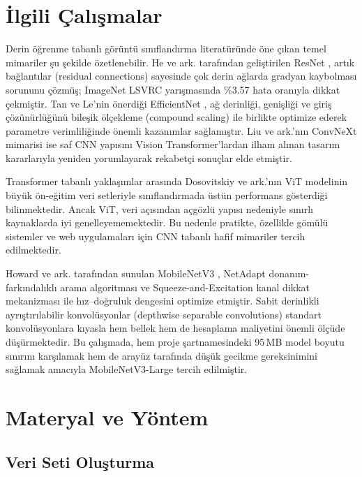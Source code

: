 \documentclass[conference]{IEEEtran}
\begin{document}
\section{İlgili Çalışmalar}

Derin öğrenme tabanlı görüntü sınıflandırma literatüründe öne çıkan
temel mimariler şu şekilde özetlenebilir. He ve ark. tarafından
geliştirilen ResNet \cite{resnet}, artık bağlantılar (residual connections)
sayesinde çok derin ağlarda gradyan kaybolması sorununu çözmüş; ImageNet
LSVRC yarışmasında \%3.57 hata oranıyla dikkat çekmiştir. Tan ve Le'nin
önerdiği EfficientNet \cite{efficientnet}, ağ derinliği, genişliği ve
giriş çözünürlüğünü bileşik ölçekleme (compound scaling) ile birlikte
optimize ederek parametre verimliliğinde önemli kazanımlar sağlamıştır.
Liu ve ark.'nın ConvNeXt \cite{convnext} mimarisi ise saf CNN yapısını
Vision Transformer'lardan ilham alınan tasarım kararlarıyla yeniden
yorumlayarak rekabetçi sonuçlar elde etmiştir.

Transformer tabanlı yaklaşımlar arasında Dosovitskiy ve ark.'nın ViT
modelinin \cite{vit} büyük ön-eğitim veri setleriyle sınıflandırmada
üstün performans gösterdiği bilinmektedir. Ancak ViT, veri açısından
açgözlü yapısı nedeniyle sınırlı kaynaklarda iyi genelleyememektedir.
Bu nedenle pratikte, özellikle gömülü sistemler ve web uygulamaları
için CNN tabanlı hafif mimariler tercih edilmektedir.

Howard ve ark. tarafından sunulan MobileNetV3 \cite{mobilenetv3},
NetAdapt donanım-farkındalıklı arama algoritması ve Squeeze-and-Excitation
\cite{senet} kanal dikkat mekanizması ile hız--doğruluk dengesini optimize
etmiştir. Sabit derinlikli ayrıştırılabilir konvolüsyonlar (depthwise
separable convolutions) standart konvolüsyonlara kıyasla hem bellek hem
de hesaplama maliyetini önemli ölçüde düşürmektedir. Bu çalışmada,
hem proje şartnamesindeki 95\,MB model boyutu sınırını karşılamak hem
de arayüz tarafında düşük gecikme gereksinimini sağlamak amacıyla
MobileNetV3-Large tercih edilmiştir.

\section{Materyal ve Yöntem}

\subsection{Veri Seti Oluşturma}
\end{document}
